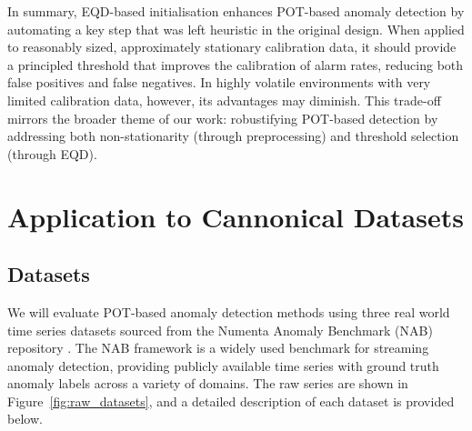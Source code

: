 \documentclass{statsmsc}
\begin{document}
In summary, EQD-based initialisation enhances POT-based anomaly detection by automating a key step that was left heuristic 
in the original design. When applied to reasonably sized, approximately stationary calibration data, 
it should provide a principled threshold that improves the calibration of alarm rates, 
reducing both false positives and false negatives. In highly volatile environments with very limited calibration data, 
however, its advantages may diminish. This trade-off mirrors the broader theme of our work: robustifying POT-based detection 
by addressing both non-stationarity (through preprocessing) and threshold selection (through EQD).

\section{Application to Cannonical Datasets}\label{sec:res}

\subsection{Datasets}\label{subsec:my_subsec}

We will evaluate POT-based anomaly detection methods using three real world time series datasets sourced from the 
Numenta Anomaly Benchmark (NAB) repository \citep{lavin2015evaluating}. 
The NAB framework is a widely used benchmark for streaming anomaly detection, providing publicly available time series 
with ground truth anomaly labels across a variety of domains. The raw series are shown in 
Figure~\ref{fig:raw_datasets}, and a detailed description of each dataset is provided below.
\end{document}
